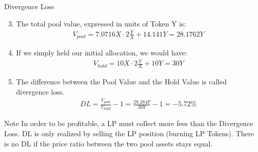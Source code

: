 \documentclass[]{beamer}
\begin{document}
\begin{frame}{Divergence Loss}

	\begin{enumerate}
	\setcounter{enumi}{2}
		\item The total pool value, expressed in units of Token Y is: 
			\begin{align*}
				V_{pool} = 7.0716 X \cdot 2 \tfrac{Y}{X} + 14.141 Y = 28.1762 Y
			\end{align*}
		\item If we simply held our initial allocation, we would have:
			\begin{align*}
			V_{hold} = 10 X \cdot 2 \tfrac{Y}{X} + 10 Y = 30 Y
			\end{align*}
		\item The difference between the Pool Value and the Hold Value is called divergence loss.
		\begin{align*}
			DL = \tfrac{V_{pool}}{V_{hold}} -1 = \tfrac{28.284 Y}{30 Y} - 1 = -5.72 \%
			\end{align*}
	\end{enumerate}	
	
	\begin{keytakeaway}{Note}
		In order to be profitable, a LP must collect more fees than the Divergence Loss. DL is only realized by selling the LP position (burning LP Tokens). There is no DL if the price ratio between the two pool assets stays equal.
	\end{keytakeaway}
	
\end{frame}
\end{document}
